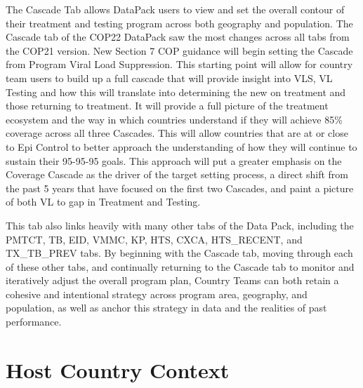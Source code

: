 \documentclass[
  openany]{book}
\begin{document}
The Cascade Tab allows DataPack users to view and set the overall
contour of their treatment and testing program across both geography and
population. The Cascade tab of the COP22 DataPack saw the most changes
across all tabs from the COP21 version. New Section 7 COP guidance will
begin setting the Cascade from Program Viral Load Suppression. This
starting point will allow for country team users to build up a full
cascade that will provide insight into VLS, VL Testing and how this will
translate into determining the new on treatment and those returning to
treatment. It will provide a full picture of the treatment ecosystem and
the way in which countries understand if they will achieve 85\% coverage
across all three Cascades. This will allow countries that are at or
close to Epi Control to better approach the understanding of how they
will continue to sustain their 95-95-95 goals. This approach will put a
greater emphasis on the Coverage Cascade as the driver of the target
setting process, a direct shift from the past 5 years that have focused
on the first two Cascades, and paint a picture of both VL to gap in
Treatment and Testing.

This tab also links heavily with many other tabs of the Data Pack,
including the PMTCT, TB, EID, VMMC, KP, HTS, CXCA, HTS\_RECENT, and
TX\_TB\_PREV tabs. By beginning with the Cascade tab, moving through each
of these other tabs, and continually returning to the Cascade tab to
monitor and iteratively adjust the overall program plan, Country Teams
can both retain a cohesive and intentional strategy across program area,
geography, and population, as well as anchor this strategy in data and
the realities of past performance.

\hypertarget{host-country-context}{%
\section{Host Country Context}\label{host-country-context}}
\end{document}
